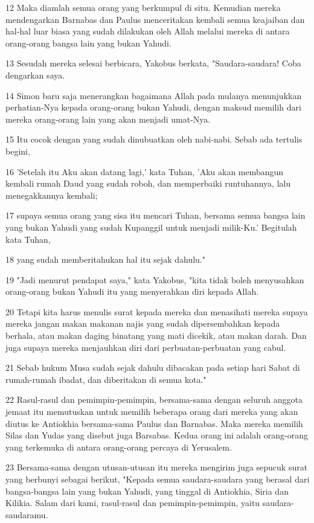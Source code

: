 \par 12 Maka diamlah semua orang yang berkumpul di situ. Kemudian mereka mendengarkan Barnabas dan Paulus menceritakan kembali semua keajaiban dan hal-hal luar biasa yang sudah dilakukan oleh Allah melalui mereka di antara orang-orang bangsa lain yang bukan Yahudi.
\par 13 Sesudah mereka selesai berbicara, Yakobus berkata, "Saudara-saudara! Coba dengarkan saya.
\par 14 Simon baru saja menerangkan bagaimana Allah pada mulanya menunjukkan perhatian-Nya kepada orang-orang bukan Yahudi, dengan maksud memilih dari mereka orang-orang lain yang akan menjadi umat-Nya.
\par 15 Itu cocok dengan yang sudah dinubuatkan oleh nabi-nabi. Sebab ada tertulis begini,
\par 16 'Setelah itu Aku akan datang lagi,' kata Tuhan, 'Aku akan membangun kembali rumah Daud yang sudah roboh, dan memperbaiki runtuhannya, lalu menegakkannya kembali;
\par 17 supaya semua orang yang sisa itu mencari Tuhan, bersama semua bangsa lain yang bukan Yahudi yang sudah Kupanggil untuk menjadi milik-Ku.' Begitulah kata Tuhan,
\par 18 yang sudah memberitahukan hal itu sejak dahulu."
\par 19 "Jadi menurut pendapat saya," kata Yakobus, "kita tidak boleh menyusahkan orang-orang bukan Yahudi itu yang menyerahkan diri kepada Allah.
\par 20 Tetapi kita harus menulis surat kepada mereka dan menasihati mereka supaya mereka jangan makan makanan najis yang sudah dipersembahkan kepada berhala, atau makan daging binatang yang mati dicekik, atau makan darah. Dan juga supaya mereka menjauhkan diri dari perbuatan-perbuatan yang cabul.
\par 21 Sebab hukum Musa sudah sejak dahulu dibacakan pada setiap hari Sabat di rumah-rumah ibadat, dan diberitakan di semua kota."
\par 22 Rasul-rasul dan pemimpin-pemimpin, bersama-sama dengan seluruh anggota jemaat itu memutuskan untuk memilih beberapa orang dari mereka yang akan diutus ke Antiokhia bersama-sama Paulus dan Barnabas. Maka mereka memilih Silas dan Yudas yang disebut juga Barsabas. Kedua orang ini adalah orang-orang yang terkemuka di antara orang-orang percaya di Yerusalem.
\par 23 Bersama-sama dengan utusan-utusan itu mereka mengirim juga sepucuk surat yang berbunyi sebagai berikut, "Kepada semua saudara-saudara yang berasal dari bangsa-bangsa lain yang bukan Yahudi, yang tinggal di Antiokhia, Siria dan Kilikia. Salam dari kami, rasul-rasul dan pemimpin-pemimpin, yaitu saudara-saudaramu.

